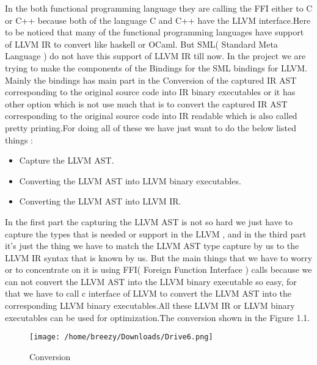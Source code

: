 \documentclass[openany]{book}
\begin{document}
	In the both functional programming language they are calling the FFI either to C or C++ because both of the language C and C++ have the LLVM interface.\newline \newline Here to be noticed that many of the functional programming languages have support of LLVM IR to convert like haskell or OCaml. But SML( Standard Meta Language ) do not have this support of LLVM IR till now. In the project we are trying to make the components of the Bindings for the SML bindings for LLVM. Mainly the bindings has main part in the Conversion of the captured IR AST corresponding to the original source code into IR binary executables or it has other option which is not use much that is to convert the captured IR AST corresponding to the original source code into IR readable which is also called pretty printing.\newline \newline For doing all of these we have just want to do the below listed things : \newline \newline \begin{itemize}
		\item Capture the LLVM AST.
		\item Converting the LLVM AST into LLVM binary executables.
		\item Converting the LLVM AST into LLVM IR.\newline \newline
	\end{itemize} In the first part the capturing the LLVM AST is not so hard we just have to capture the types that is needed or support in the LLVM , and in the third part it’s just the thing we have to match the LLVM AST type capture by us to the LLVM IR syntax that is known by us. But the main things that we have to worry or to concentrate on it is using FFI( Foreign Function Interface )  calls  because we can not convert the LLVM AST into the LLVM binary executable so easy, for that we have to call c interface of LLVM to convert the LLVM AST into the corresponding LLVM binary executables.\newline \newline All these LLVM IR or LLVM binary executables can be used for optimization.The conversion shown in the Figure 1.1.
	\begin{figure}
	\centering
	\texttt{[image: /home/breezy/Downloads/Drive6.png]}
	\caption{Conversion}
	\label{fig:1.1}
	\end{figure}
\end{document}
